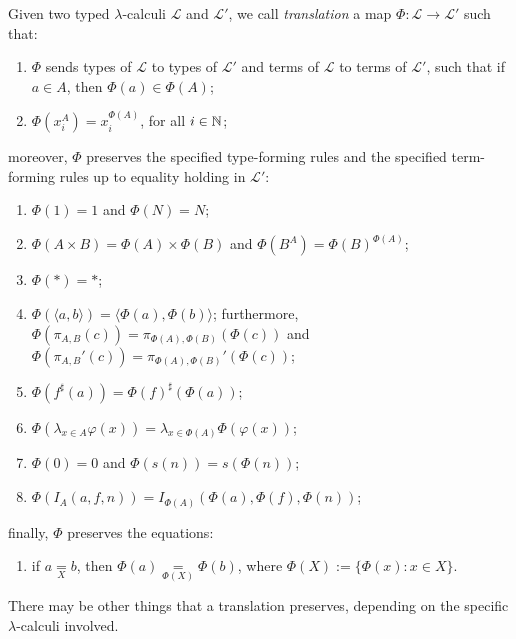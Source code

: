 \begin{definition}
    Given two typed $\lambda$-calculi $\mathcal L$ and $\mathcal L'$, we call \emph{translation} a map $\Phi : \mathcal L \to \mathcal L'$
    such that:
    \begin{enumerate}[label=(\roman*)]
        \item $\Phi$ sends types of $\mathcal L$ to types of $\mathcal L'$ and terms of $\mathcal L$ to terms of $\mathcal L'$, such that
         if $a \in A$, then $\Phi(a) \in \Phi(A)$;
        \item $\Phi(x_i^A) = x_i^{\Phi(A)}$, for all $i \in \mathbb{N}$;
    \end{enumerate}
    moreover, $\Phi$ preserves the specified type-forming rules and the specified term-forming rules up to equality holding in $\mathcal L'$:
    \begin{enumerate}[label=(\roman*),resume]
        \item $\Phi(1) = 1$ and $\Phi(N) = N$;
        \item $\Phi(A \times B) = \Phi(A) \times \Phi(B)$ and $\Phi(B^A) = \Phi(B)^{\Phi(A)}$;
        \item $\Phi(*) = *$;
        \item $\Phi(\langle a,b\rangle) = \langle \Phi(a),\Phi(b)\rangle$; furthermore, $\Phi(\pi_{A,B}(c)) = \pi_{\Phi(A),\Phi(B)}(\Phi(c))$ and $\Phi(\pi_{A,B}'(c)) = \pi_{\Phi(A),\Phi(B)}'(\Phi(c))$;
        \item $\Phi(f^\sharp(a)) = \Phi(f)^\sharp(\Phi(a))$;
        \item $\Phi(\lambda_{x \in A} \varphi(x)) = \lambda_{x \in \Phi(A)} \Phi(\varphi(x))$;
        \item $\Phi(0) = 0$ and $\Phi(s(n)) = s(\Phi(n))$;
        \item $\Phi(I_A(a,f,n)) = I_{\Phi(A)}(\Phi(a),\Phi(f),\Phi(n))$;
    \end{enumerate}
    finally, $\Phi$ preserves the equations:
    \begin{enumerate}[label=(\roman*),resume]
        \item if $a \underset{X}{=} b$, then $\Phi(a) \underset{\Phi(X)}{=} \Phi(b)$, where $\Phi(X) := \{\Phi(x) : x \in X\}$.
    \end{enumerate}
\end{definition}

There may be other things that a translation preserves, depending on the specific $\lambda$-calculi involved.


